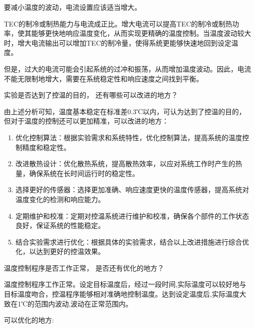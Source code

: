 \documentclass[dvipsnames, svgnames,a4paper,11pt]{article}
\begin{document}
    要减小温度的波动，电流设置应该适当增大。
    
    TEC的制冷或制热能力与电流成正比。增大电流可以提高TEC的制冷或制热功率，使其能够更快地响应温度变化，从而实现更精确的温度控制。当温度波动较大时，增大电流输出可以增加TEC的制冷量，使得系统更能够快速地回到设定温度。

    但是，过大的电流可能会引起系统的过冲和振荡，从而增加温度波动。因此，电流不能无限制地增大，需要在系统稳定性和响应速度之间找到平衡。
    



    \begin{question}
        实验是否达到了控温的目的， 还有哪些可以改进的地方？
    \end{question}

        由上述分析可知，温度基本稳定在标准差0.3℃以内，可认为达到了控温的目的，但对于温度的控制还可以更加精准，可以改进的地方：

        \begin{enumerate}
            \item 优化控制算法：根据实验需求和系统特性，优化控制算法，提高系统的温度控制精度和稳定性。
            \item 改进散热设计：优化散热系统，提高散热效率，以应对系统工作时产生的热量，确保系统在长时间运行时的稳定性。
            \item 选择更好的传感器：选择更加准确、响应速度更快的温度传感器，提高系统对温度变化的检测和响应能力。
            \item 定期维护和校准：定期对控温系统进行维护和校准，确保各个部件的工作状态良好，保证系统的性能稳定。
            \item 结合实验需求进行优化：根据具体的实验需求，结合以上改进措施进行综合优化，以达到更好的控温效果。
        \end{enumerate}






    \begin{question}
        温度控制程序是否工作正常， 是否还有优化的地方？
    \end{question}

    温度控制程序工作正常。设定目标温度后，经过一段时间,实际温度可以较好地与目标温度吻合，控温程序能够相对准确地控制温度。达到设定温度后,实际温度大致在1℃的范围内波动,波动在正常范围内。

    可以优化的地方:
\end{document}
